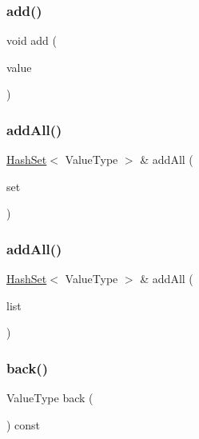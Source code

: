 \subsubsection{\texorpdfstring{add()}{add()}}
{\footnotesize\ttfamily void add (\begin{DoxyParamCaption}\item[{const Value\+Type \&}]{value }\end{DoxyParamCaption})}

\mbox{\label{classHashSet_ac8bf89539d8c88f5af81597d7646bfae}} 
\subsubsection{\texorpdfstring{add\+All()}{addAll()}\hspace{0.1cm}{\footnotesize\ttfamily [1/2]}}
{\footnotesize\ttfamily \mbox{\hyperlink{classHashSet}{Hash\+Set}}$<$ Value\+Type $>$ \& add\+All (\begin{DoxyParamCaption}\item[{const \mbox{\hyperlink{classHashSet}{Hash\+Set}}$<$ Value\+Type $>$ \&}]{set }\end{DoxyParamCaption})}

\mbox{\label{classHashSet_a19b47d1079e460fc4024ee92a043546f}} 
\subsubsection{\texorpdfstring{add\+All()}{addAll()}\hspace{0.1cm}{\footnotesize\ttfamily [2/2]}}
{\footnotesize\ttfamily \mbox{\hyperlink{classHashSet}{Hash\+Set}}$<$ Value\+Type $>$ \& add\+All (\begin{DoxyParamCaption}\item[{std\+::initializer\+\_\+list$<$ Value\+Type $>$}]{list }\end{DoxyParamCaption})}

\mbox{\label{classHashSet_a38cbd80c93f450dc9bf3ca7c6a6220bd}} 
\subsubsection{\texorpdfstring{back()}{back()}}
{\footnotesize\ttfamily Value\+Type back (\begin{DoxyParamCaption}{ }\end{DoxyParamCaption}) const}

